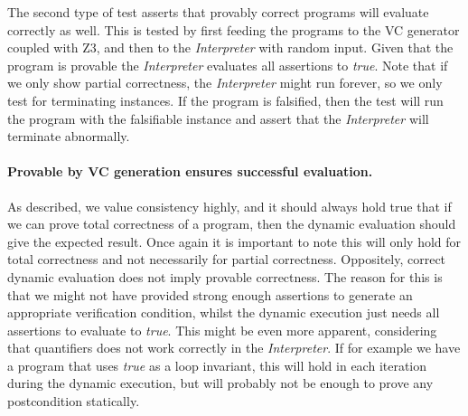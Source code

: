 The second type of test asserts that provably correct programs will evaluate correctly as well.
This is tested by first feeding the programs to the VC generator coupled with Z3, and then to the \textit{Interpreter} with random input.
Given that the program is provable the \textit{Interpreter} evaluates all assertions to \textit{true}.
Note that if we only show partial correctness, the \textit{Interpreter} might run forever, so we only test for terminating instances.
If the program is falsified, then the test will run the program with the falsifiable instance and assert that the \textit{Interpreter} will terminate abnormally.

\paragraph{Provable by VC generation ensures successful evaluation.}

As described, we value consistency highly, and it should always hold true that if we can prove total correctness of a program, then the dynamic evaluation should give the expected result. Once again it is important to note this will only hold for total correctness and not necessarily for partial correctness.
Oppositely, correct dynamic evaluation does not imply provable correctness.
The reason for this is that we might not have provided strong enough assertions to generate an appropriate verification condition, whilst the dynamic execution just needs all assertions to evaluate to \textit{true}. 
This might be even more apparent, considering that quantifiers does not work correctly in the \textit{Interpreter}.
If for example we have a program that uses \textit{true} as a loop invariant, this will hold in each iteration during the dynamic execution, but will probably not be enough to prove any postcondition statically.

